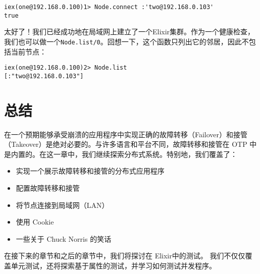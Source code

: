 \begin{code}{}
\begin{verbatim}
iex(one@192.168.0.100)1> Node.connect :'two@192.168.0.103'
true
\end{verbatim}
\end{code}

太好了！我们已经成功地在局域网上建立了一个Elixir集群。作为一个健康检查，我们也可以做一个\texttt{Node.list/0}。回想一下，这个函数只列出它的邻居，因此不包括当前节点：

\begin{code}{}
\begin{verbatim}
iex(one@192.168.0.100)2> Node.list
[:"two@192.168.0.103"]
\end{verbatim}
\end{code}

\section{总结}

在一个预期能够承受崩溃的应用程序中实现正确的故障转移（Failover）和接管（Takeover）是绝对必要的。与许多语言和平台不同，故障转移和接管在
OTP 中是内置的。在这一章中，我们继续探索分布式系统。特别地，我们覆盖了：

\begin{itemize}

\item  实现一个展示故障转移和接管的分布式应用程序
\item  配置故障转移和接管
\item  将节点连接到局域网（LAN）
\item  使用 Cookie
\item  一些关于 Chuck Norris 的笑话
\end{itemize}

在接下来的章节和之后的章节中，我们将探讨在 Elixir中的测试。
我们不仅仅覆盖单元测试，还将探索基于属性的测试，并学习如何测试并发程序。
